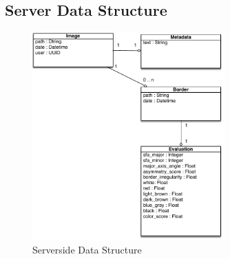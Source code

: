\subsection{Server Data Structure}


\begin{figure}[H]
    \centering
    \includegraphics[height=8cm,keepaspectratio]{assets/data/server_data.pdf}
    \caption{Serverside Data Structure}
    \label{fig:data_server}
\end{figure}